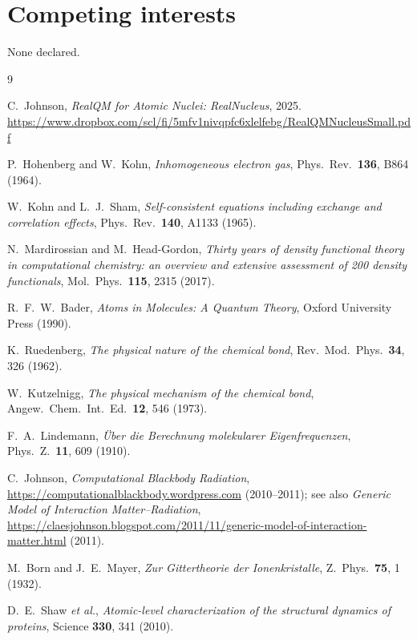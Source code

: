 \documentclass[11pt]{article}
\begin{document}
\section*{Competing interests}

None declared.

\begin{thebibliography}{9}

C.~Johnson,
\emph{RealQM for Atomic Nuclei: RealNucleus},
2025.
\url{https://www.dropbox.com/scl/fi/5mfv1nivqpfc6xlelfebg/RealQMNucleusSmall.pdf}

P.~Hohenberg and W.~Kohn,
\emph{Inhomogeneous electron gas},
Phys.\ Rev.\ \textbf{136}, B864 (1964).

W.~Kohn and L.~J.~Sham,
\emph{Self-consistent equations including exchange and correlation effects},
Phys.\ Rev.\ \textbf{140}, A1133 (1965).

N.~Mardirossian and M.~Head-Gordon,
\emph{Thirty years of density functional theory in computational chemistry: an overview and extensive assessment of 200 density functionals},
Mol.\ Phys.\ \textbf{115}, 2315 (2017).

R.~F.~W.~Bader,
\emph{Atoms in Molecules: A Quantum Theory},
Oxford University Press (1990).

K.~Ruedenberg,
\emph{The physical nature of the chemical bond},
Rev.\ Mod.\ Phys.\ \textbf{34}, 326 (1962).

W.~Kutzelnigg,
\emph{The physical mechanism of the chemical bond},
Angew.\ Chem.\ Int.\ Ed.\ \textbf{12}, 546 (1973).

F.~A.~Lindemann,
\emph{\"Uber die Berechnung molekularer Eigenfrequenzen},
Phys.\ Z.\ \textbf{11}, 609 (1910).

C.~Johnson,
\emph{Computational Blackbody Radiation},
\url{https://computationalblackbody.wordpress.com} (2010--2011);
see also \emph{Generic Model of Interaction Matter--Radiation},
\url{https://claesjohnson.blogspot.com/2011/11/generic-model-of-interaction-matter.html} (2011).

M.~Born and J.~E.~Mayer,
\emph{Zur Gittertheorie der Ionenkristalle},
Z.~Phys.\ \textbf{75}, 1 (1932).

D.~E.~Shaw \emph{et al.},
\emph{Atomic-level characterization of the structural dynamics of proteins},
Science \textbf{330}, 341 (2010).


\end{thebibliography}
\end{document}
